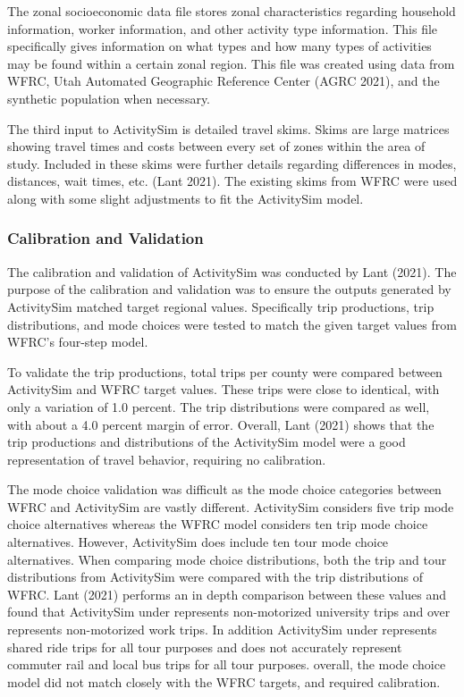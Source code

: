 \documentclass[12pt, oneside, openright]{byuthesis}
\begin{document}
The zonal socioeconomic data file stores zonal characteristics regarding household information, worker information, and other activity type information. This file specifically gives information on what types and how many types of activities may be found within a certain zonal region. This file was created using data from WFRC, Utah Automated Geographic Reference Center (AGRC 2021), and the synthetic population when necessary.

The third input to ActivitySim is detailed travel skims. Skims are large matrices showing travel times and costs between every set of zones within the area of study. Included in these skims were further details regarding differences in modes, distances, wait times, etc. (Lant 2021). The existing skims from WFRC were used along with some slight adjustments to fit the ActivitySim model.

\hypertarget{asimcal}{%
\subsubsection{Calibration and Validation}\label{asimcal}}

The calibration and validation of ActivitySim was conducted by Lant (2021). The purpose of the calibration and validation was to ensure the outputs generated by ActivitySim matched target regional values. Specifically trip productions, trip distributions, and mode choices were tested to match the given target values from WFRC's four-step model.

To validate the trip productions, total trips per county were compared between ActivitySim and WFRC target values. These trips were close to identical, with only a variation of 1.0 percent. The trip distributions were compared as well, with about a 4.0 percent margin of error. Overall, Lant (2021) shows that the trip productions and distributions of the ActivitySim model were a good representation of travel behavior, requiring no calibration.

The mode choice validation was difficult as the mode choice categories between WFRC and ActivitySim are vastly different. ActivitySim considers five trip mode choice alternatives whereas the WFRC model considers ten trip mode choice alternatives. However, ActivitySim does include ten tour mode choice alternatives. When comparing mode choice distributions, both the trip and tour distributions from ActivitySim were compared with the trip distributions of WFRC. Lant (2021) performs an in depth comparison between these values and found that ActivitySim under represents non-motorized university trips and over represents non-motorized work trips. In addition ActivitySim under represents shared ride trips for all tour purposes and does not accurately represent commuter rail and local bus trips for all tour purposes. overall, the mode choice model did not match closely with the WFRC targets, and required calibration.
\end{document}
